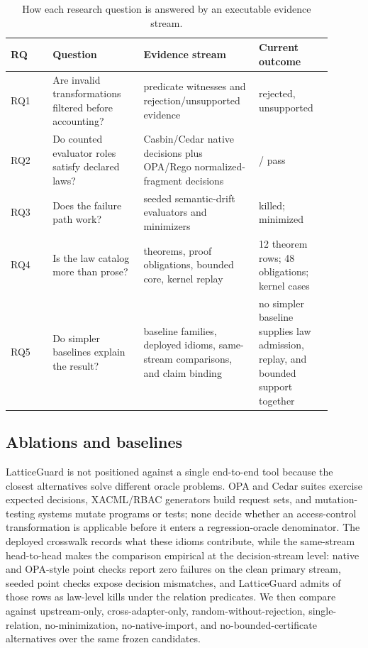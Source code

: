 \documentclass[10pt,conference]{IEEEtran}
\begin{document}
\begin{table}[t]
\centering
\caption{How each research question is answered by an executable evidence stream.}
\label{tab:rqmap}
\begin{tabular}{p{0.12\linewidth}p{0.26\linewidth}p{0.31\linewidth}p{0.21\linewidth}}
\toprule
RQ & Question & Evidence stream & Current outcome \\
\midrule
RQ1 & Are invalid transformations filtered before accounting? & predicate witnesses and rejection/unsupported evidence & \LGRejected{} rejected, \LGUnsupported{} unsupported \\
RQ2 & Do counted evaluator roles satisfy declared laws? & Casbin/Cedar native decisions plus OPA/Rego normalized-fragment decisions & \LGPrimaryPasses{}/\LGPrimaryObligations{} pass \\
RQ3 & Does the failure path work? & seeded semantic-drift evaluators and minimizers & \LGSeededKilled{} killed; \LGCounterexamples{} minimized \\
RQ4 & Is the law catalog more than prose? & theorems, proof obligations, bounded core, kernel replay & 12 theorem rows; 48 obligations; \LGMechanizedKernelCases{} kernel cases \\
RQ5 & Do simpler baselines explain the result? & \LGBaselineFamilies{} baseline families, \LGDeployedCrosswalkRows{} deployed idioms, \LGDeployedHeadToHeadRows{} same-stream comparisons, and claim binding & no simpler baseline supplies law admission, replay, and bounded support together \\
\bottomrule
\end{tabular}
\end{table}

\subsection{Ablations and baselines}
\label{sec:baselines}
LatticeGuard is not positioned against a single end-to-end tool because the closest alternatives solve different oracle problems.  OPA and Cedar suites exercise expected decisions, XACML/RBAC generators build request sets, and mutation-testing systems mutate programs or tests; none decide whether an access-control transformation is applicable before it enters a regression-oracle denominator.  The deployed crosswalk records what these idioms contribute, while the same-stream head-to-head makes the comparison empirical at the decision-stream level: native and OPA-style point checks report zero failures on the clean primary stream, seeded point checks expose \LGSeededPointMismatches{} decision mismatches, and LatticeGuard admits \LGSeededHeadToHeadOverlap{} of those rows as law-level kills under the relation predicates.  We then compare against upstream-only, cross-adapter-only, random-without-rejection, single-relation, no-minimization, no-native-import, and no-bounded-certificate alternatives over the same frozen candidates.
\end{document}
